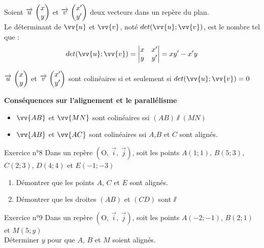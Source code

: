 \documentclass[12pt,a4paper]{article}
\def\Oij{$\left(\text{O},~\vec{i},~\vec{j}\right)$}
\begin{document}
\begin{defi}
Soient $\overrightarrow{u}\, \begin{pmatrix} x\\ y \end{pmatrix}$ et $\overrightarrow{v}\, \begin{pmatrix} x'\\ y' \end{pmatrix}$ deux vecteurs dans un repère du plan.\\
Le déterminant de $\vv{u}$ et $\vv{v}$, noté $det(\vv{u};\vv{v})$, est le nombre tel que : $$det(\vv{u};\vv{v})=\begin{vmatrix} x & x' \\ y & y' \end{vmatrix}=xy'-x'y$$

\end{defi}


\begin{pro}
$\overrightarrow{u}\, \begin{pmatrix} x\\ y \end{pmatrix}$ et $\overrightarrow{v}\, \begin{pmatrix} x'\\ y' \end{pmatrix}$ sont colinéaires si et seulement si $det(\vv{u};\vv{v})=0$
\end{pro}

\begin{pro}
\textbf{Conséquences sur l'alignement et le parallélisme}

\begin{itemize}
    \item $\vv{AB}$ et $\vv{MN}$ sont colinéaires ssi $(AB)\sslash (MN)$
    \item $\vv{AB}$ et $\vv{AC}$ sont colinéaires ssi $A$,$B$ et $C$ sont alignés.
\end{itemize}
\end{pro}

\begin{mybox}{Exercice n°8}
Dans un repère \Oij{}, soit les points $A(1;1)$, $B(5; 3)$, $C(2;3)$, $D(4;4)$ et $E(-1;-3)$\\

\begin{enumerate}
    \item Démontrer que les points $A$, $C$ et $E$ sont alignés.
    \item Démontrer que les droites $(AB)$ et $(CD)$ sont $\sslash$
\end{enumerate}


\end{mybox}

\begin{framed}
\vspace{3cm}
\end{framed}


\begin{mybox}{Exercice n°9}
Dans un repère \Oij{}, soit les points $A(-2;-1)$, $B(2; 1)$ et $M(5;y)$\\

Déterminer $y$ pour que $A$, $B$ et $M$ soient alignés.

\end{mybox}
\end{document}
